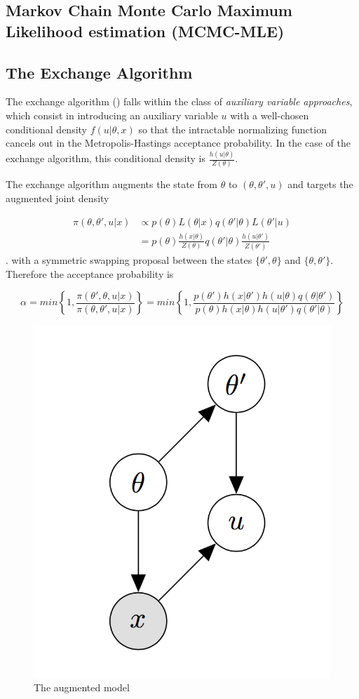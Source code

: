 \documentclass[]{article}
\begin{document}
\hypertarget{markov-chain-monte-carlo-maximum-likelihood-estimation-mcmc-mle}{%
\subsection{Markov Chain Monte Carlo Maximum Likelihood estimation
(MCMC-MLE)}\label{markov-chain-monte-carlo-maximum-likelihood-estimation-mcmc-mle}}

\hypertarget{the-exchange-algorithm}{%
\subsection{The Exchange Algorithm}\label{the-exchange-algorithm}}

The exchange algorithm (\cite{murray2012mcmc}) falls within the class of
\emph{auxiliary variable approaches}, which consist in introducing an
auxiliary variable \(u\) with a well-chosen conditional density
\(f(u|\theta,x)\) so that the intractable normalizing function cancels
out in the Metropolis-Hastings acceptance probability. In the case of
the exchange algorithm, this conditional density is
\(\frac{h(u|\theta)}{Z(\theta)}\).

The exchange algorithm augments the state from \(\theta\) to
\((\theta, \theta', u)\) and targets the augmented joint density

\[\begin{split}\pi(\theta,\theta',u|x) & \propto p(\theta)L(\theta|x)q(\theta'|\theta)L(\theta'|u) \\ & = p(\theta)\frac{h(x|\theta)}{Z(\theta)}q(\theta'|\theta)\frac{h(u|\theta')}{Z(\theta')}\end{split}\].
with a symmetric swapping proposal between the states
\(\{\theta',\theta\}\) and \(\{\theta,\theta'\}\). Therefore the
acceptance probability is

\[\alpha=min \left\{1,\frac{\pi(\theta',\theta,u|x)}{\pi(\theta,\theta',u|x)}\right\}=min\left\{1,\frac{p(\theta')h(x|\theta')h(u|\theta)q(\theta|\theta')}{p(\theta)h(x|\theta)h(u|\theta')q(\theta'|\theta)}\right\}\]

\begin{figure}[H]

{\centering \includegraphics[width=0.2\linewidth,height=0.2\textheight]{exchange} 

}

\caption{\label{fig:triangle}The augmented model}\label{fig:unnamed-chunk-2}
\end{figure}
\end{document}
